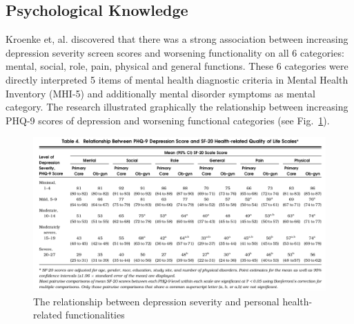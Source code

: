 \documentclass[12pt]{article}
\begin{document}
\subsection{Psychological Knowledge}
Kroenke et, al. \cite{Kroenke} discovered that there was a strong association between increasing depression severity screen scores and worsening functionality on all 6 categories: mental, social, role, pain, physical and general functions. These 6 categories were directly interpreted 5 items of mental health diagnostic criteria in Mental Health Inventory (MHI-5) and additionally mental disorder symptoms as mental category. The research illustrated graphically the relationship between increasing PHQ-9 scores of depression and worsening functional categories (see Fig.~\ref{fig2}). 
\begin{figure}[h]
\includegraphics[width=1\textwidth]{phq-9.png}
\caption{The relationship between depression severity and personal health-related functionalities\cite{Kroenke}} \label{fig2}
\end{figure}
\end{document}
